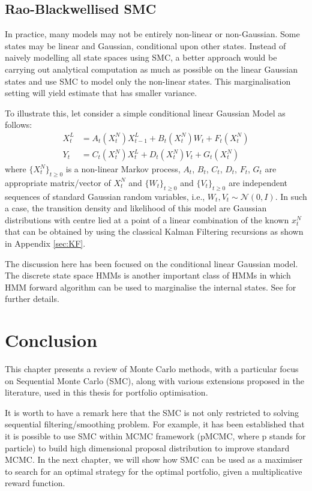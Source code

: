 \subsection{Rao-Blackwellised SMC}
\label{sec:msmc}
In practice, many models may not be entirely non-linear or non-Gaussian. Some states may be linear and Gaussian, conditional upon other states. Instead of naively modelling all state spaces using SMC, a better approach would be carrying out analytical computation as much as possible on the linear Gaussian states and use SMC to model only the non-linear states. This marginalisation setting will yield estimate that has smaller variance.

To illustrate this, let consider a simple conditional linear Gaussian Model as follows:
\begin{align}
  X^L_t &= A_t(X^N_t)X^L_{t-1} + B_t(X^N_t)W_t + F_t(X^N_t) \\
  Y_t &= C_t(X^N_t)X^L_t + D_t(X^N_t)V_t + G_t(X^N_t)
\end{align}
where $\{X^N_t\}_{t \geq 0}$ is a non-linear Markov process, $A_t$, $B_t$, $C_t$, $D_t$, $F_t$, $G_t$ are appropriate matrix/vector of $X^N_t$ and  $\{W_t\}_{t \geq 0}$ and  $\{V_t\}_{t \geq 0}$ are independent sequences of standard Gaussian random variables, i.e., $W_t, V_t \sim \mathcal{N}(0,I)$. In such a case, the transition density and likelihood of this model are Gaussian distributions with centre lied at a point of a linear combination of the known $x^N_t$ that can be obtained by using the classical Kalman Filtering recursions as shown in Appendix \ref{sec:KF}.


The discussion here has been focused on the conditional linear Gaussian model. The discrete state space HMMs is another important class of HMMs in which HMM forward algorithm \cite{LRR89} can be used to marginalise the internal states. See \cite{CO05} for further details.


\section{Conclusion}
This chapter presents a review of Monte Carlo methods, with a particular focus on Sequential Monte Carlo (SMC), along with various extensions proposed in the literature, used in this thesis for portfolio optimisation.

It is worth to have a remark here that the SMC is not only restricted to solving sequential filtering/smoothing problem. For example, it has been established that it is possible to use SMC within MCMC framework (pMCMC, where p stands for particle) \cite{CA10} to build high dimensional proposal distribution to improve standard MCMC. In the next chapter, we will show how SMC can be used as a maximiser to search for an optimal strategy for the optimal portfolio, given a multiplicative reward function.



